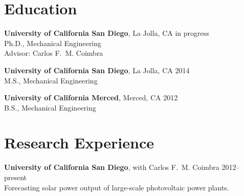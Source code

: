 \documentclass[]{res}
\begin{document}
\address{University of California San Diego \\ 9500 Gilman Drive \#0411 \\ La Jolla, CA 92093--0411}
\address{\hfill \href{mailto:dplarson@ucsd.edu}{dplarson@ucsd.edu} \\
    \hfill \url{http://ieng6.ucsd.edu/~dplarson} \\
    \hfill \url{http://github.com/dplarson}
}


\begin{resume}


\section{Education}
\vspace{0.1in}

\textbf{University of California San Diego}, La Jolla, CA \hfill in progress \\
Ph.D., Mechanical Engineering \\
Advisor: Carlos F.~M. Coimbra \\

\vspace{-0.2in}

\textbf{University of California San Diego}, La Jolla, CA \hfill 2014 \\
M.S., Mechanical Engineering \\

\vspace{-0.2in}

\textbf{University of California Merced}, Merced, CA \hfill 2012 \\
B.S., Mechanical Engineering


\section{Research Experience}
\vspace{0.1in}

\textbf{University of California San Diego}, with Carlos F.~M. Coimbra \hfill 2012--present\\
Forecasting solar power output of large-scale photovoltaic power plants.


\end{resume}
\end{document}

